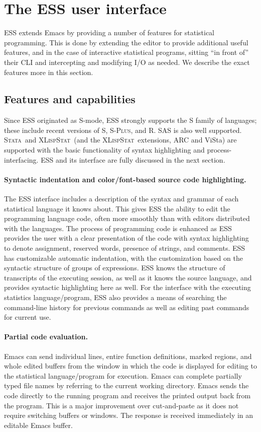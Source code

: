 \documentclass{article}
\newcommand*{\Splus}{\textsc{S-Plus}}
\newcommand*{\XLispStat}{\textsc{XLispStat}}
\newcommand*{\Stata}{\textsc{Stata}}
\begin{document}
\section{The ESS user interface}
\label{sec:ESS}

ESS extends Emacs by providing a number of features for statistical
programming.  This is done by extending the editor to provide
additional useful features, and in the case of interactive statistical
programs, sitting ``in front of'' their CLI and intercepting and
modifying I/O as needed.  We describe the exact features more in this
section.

\subsection{Features and capabilities}
\label{sec:ESS:features}

Since ESS originated as S-mode, ESS strongly supports the S family of
languages; these include recent versions of S, \Splus, and R.  SAS is
also well supported.  \Stata\ and \XLispStat\ 
(and the \XLispStat\ extensions, ARC and ViSta) are supported with the
basic functionality of syntax highlighting and process-interfacing.
ESS and its interface are fully discussed in the next section.

\paragraph{Syntactic indentation and color/font-based source code
  highlighting.}
The ESS interface includes a description of the syntax and grammar of
each statistical language it knows about.  This gives ESS the ability
to edit the programming language code, often more smoothly than with
editors distributed with the languages.  The process of programming
code is enhanced as ESS provides the user with a clear presentation of
the code with syntax highlighting to denote assignment, reserved
words, presence of strings, and comments.  ESS has customizable
automatic indentation, with the customization based on the syntactic
structure of groups of expressions.  ESS knows the structure of
transcripts of the executing session, as well as it knows the source
language, and provides syntactic highlighting here as well.  For the
interface with the executing statistics language/program, ESS also
provides a means of searching the command-line history for previous
commands as well as editing past commands for current use.

\paragraph{Partial code evaluation.}
Emacs can send individual lines, entire function definitions, marked
regions, and whole edited buffers from the window in which the code is
displayed for editing to the statistical language/program for
execution.  Emacs can complete partially typed file names by referring
to the current working directory.  Emacs sends the code directly to
the running program and receives the printed output back from the
program.  This is a major improvement over cut-and-paste as it does 
not require switching buffers or windows.  The response is
received immediately in an editable Emacs buffer.
\end{document}

